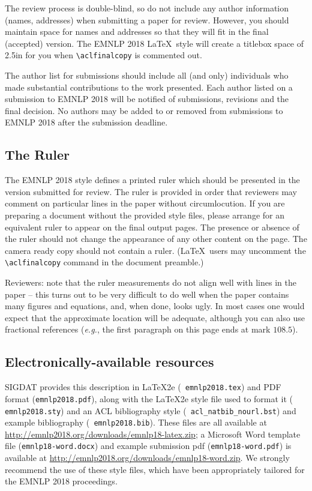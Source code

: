 \documentclass[11pt,a4paper]{article}
\newcommand\confname{EMNLP 2018}
\newcommand\conforg{SIGDAT}
\begin{document}
The review process is double-blind, so do not include any author information (names, addresses) when submitting a paper for review.  
However, you should maintain space for names and addresses so that they will fit in the final (accepted) version.  The \confname{} \LaTeX\ style will create a titlebox space of 2.5in for you when {\small\verb|\aclfinalcopy|} is commented out.  

The author list for submissions should include all (and only) individuals who made substantial contributions to the work presented. Each author listed on a submission to \confname{} will be notified of submissions, revisions and the final decision. No authors may be added to or removed from submissions to \confname{} after the submission deadline.

\subsection{The Ruler}
The \confname{} style defines a printed ruler which should be presented in the
version submitted for review.  The ruler is provided in order that
reviewers may comment on particular lines in the paper without
circumlocution.  If you are preparing a document without the provided
style files, please arrange for an equivalent ruler to
appear on the final output pages.  The presence or absence of the ruler
should not change the appearance of any other content on the page.  The
camera ready copy should not contain a ruler. (\LaTeX\ users may uncomment the {\small\verb|\aclfinalcopy|} command in the document preamble.)  

Reviewers: note that the ruler measurements do not align well with
lines in the paper -- this turns out to be very difficult to do well
when the paper contains many figures and equations, and, when done,
looks ugly. In most cases one would expect that the approximate
location will be adequate, although you can also use fractional
references ({\em e.g.}, the first paragraph on this page ends at mark $108.5$).

\subsection{Electronically-available resources}

\conforg{} provides this description in \LaTeX2e{} ({\small\tt
  emnlp2018.tex}) and PDF format ({\small\tt emnlp2018.pdf}), along
with the \LaTeX2e{} style file used to format it ({\small\tt
  emnlp2018.sty}) and an ACL bibliography style ({\small\tt
  acl\_natbib\_nourl.bst}) and example bibliography ({\small\tt
  emnlp2018.bib}).  These files are all available at
\url{http://emnlp2018.org/downloads/emnlp18-latex.zip}; a Microsoft
Word template file ({\small\tt emnlp18-word.docx}) and example
submission pdf ({\small\tt emnlp18-word.pdf}) is available at
\url{http://emnlp2018.org/downloads/emnlp18-word.zip}.  We strongly
recommend the use of these style files, which have been appropriately
tailored for the \confname{} proceedings.
\end{document}
